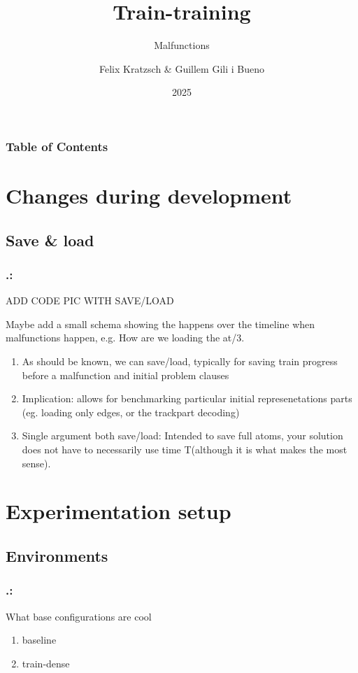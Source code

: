 \documentclass{beamer}
\title{Train-training}
\subtitle{Malfunctions}
\author{Felix  Kratzsch \& Guillem Gili i Bueno  }
\institute{Potsdam University - Railway Scheudling }
\date{2025}
\begin{document}
\frame{\titlepage}

\begin{frame}[label=toc]
\frametitle{Table of Contents}
\tableofcontents
\end{frame} 


\section{Changes during development}
\subsection{Save \& load}
\begin{frame}
	\frametitle{\thesection.\thesubsection   \secname : \subsecname}
	
	ADD CODE PIC WITH SAVE/LOAD
	
	Maybe add a small schema  showing the happens over the timeline when malfunctions happen, e.g. How are we loading the at/3.
	\begin{enumerate}
	\item{As should be known, we can save/load, typically for saving train progress before a malfunction and initial problem clauses} 
	\item{Implication: allows for benchmarking particular initial represenetations parts (eg. loading only edges, or the trackpart decoding)}
	\item{Single argument both save/load: Intended to save full atoms, your solution does not have to necessarily use time T(although it is what makes the most sense). }
	
	 
\end{enumerate}
\end{frame}


\section{Experimentation setup}

\subsection{Environments}
\begin{frame}
	\frametitle{\thesection.\thesubsection   \secname : \subsecname}
	What base configurations are cool
	\begin{enumerate}
		\item{baseline} 
		\item{train-dense} 
	\end{enumerate}
	
\end{frame}
\end{document}

